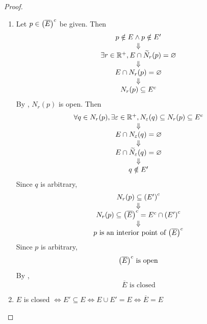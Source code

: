 \begin{proof}
    \begin{enumerate}[label=\textbf{(\Alph*)}]
        \item Let $p \in \paren*{\overline{E}}^{c}$ be given. Then
        \[
        \begin{array}{c}
            p \notin E \land p \notin E' \\
            \Downarrow \\
            \exists r \in \R^{+}, E \cap \widetilde{N}_{r}(p) = \vnot \\
            \Downarrow \\
            E \cap N_{r}(p) = \vnot \\
            \Downarrow \\
            N_{r}(p) \subseteq E^{c}
        \end{array}
        \]
        By , $N_{r}(p)$ is open. Then
        \[
        \begin{array}{c}
            \forall q \in N_{r}(p), \exists \veps \in \R^{+}, N_{\veps}(q) \subseteq N_{r}(p) \subseteq E^{c} \\
            \Downarrow \\
            E \cap N_{\veps}(q) = \vnot \\
            \Downarrow \\
            E \cap \widetilde{N}_{\veps}(q) = \vnot \\
            \Downarrow \\
            q \notin E'
        \end{array}
        \]
        Since $q$ is arbitrary,
        \[
        \begin{array}{c}
            N_{r}(p) \subseteq \paren*{E'}^{c} \\
            \Downarrow \\
            N_{r}(p) \subseteq \paren*{\overline{E}}^{c} = E^{c} \cap \paren*{E'}^{c} \\
            \Downarrow \\
            p \text{ is an interior point of } \paren*{\overline{E}}^{c}
        \end{array}
        \]
        Since $p$ is arbitrary,
        \[
        \paren*{\overline{E}}^{c} \text{ is open}
        \]
        By ,
        \[
        \overline{E} \text{ is closed}
        \]
        \item $E$ is closed $\iff E' \subseteq E \iff E \cup E' = E \iff \overline{E} = E$

\end{enumerate}
\end{proof}
